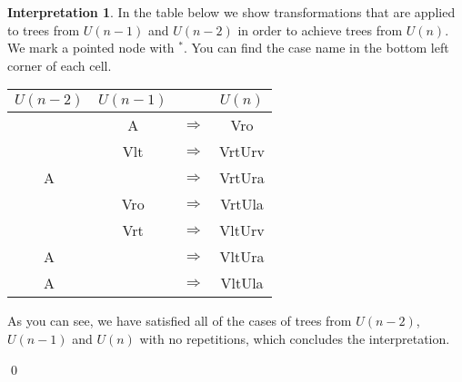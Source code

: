 \documentclass[final]{article}
\theoremstyle{definition}
\theoremstyle{definition}
\newtheorem{interpretation}{Interpretation}[subsection]
\theoremstyle{remark}
\newcommand{\pointed}[1]{\ensuremath{{#1}^*}}
\begin{document}
\begin{interpretation}
In the table below we show transformations that are applied to trees from \(U(n-1)\) and \(U(n-2)\) in order to achieve trees from \(U(n)\). We mark a pointed node with \(\pointed{}\). You can find the case name in the bottom left corner of each cell.

\begin{center}
    \begin{longtable}{| c | c | c | c |}
        \hline

        \(U(n-2)\) &
        \(U(n-1)\) &
               &
        \(U(n)\)\\
        \hline

        &
        A  &
        \(\Rightarrow\)&
        Vro  \\
        \hline

        &
        Vlt  &
        \(\Rightarrow\)&
        VrtUrv  \\
        \hline

        A  &
        &
        \(\Rightarrow\)&
        VrtUra  \\
        \hline

        &
        Vro  &
        \(\Rightarrow\)&
        VrtUla  \\
        \hline

        &
        Vrt  &
        \(\Rightarrow\)&
        VltUrv  \\
        \hline

        A  &
        &
        \(\Rightarrow\)&
        VltUra  \\
        \hline

        A  &
        &
        \(\Rightarrow\)&
        VltUla  \\
        \hline
    \end{longtable}
\end{center}


As you can see, we have satisfied all of the cases of trees from \(U(n-2)\), \(U(n-1)\) and \(U(n)\) with no repetitions, which concludes the interpretation.

\qed%
\end{interpretation}
\end{document}
